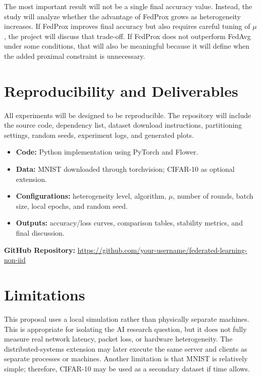 \documentclass[11pt,a4paper]{article}
\begin{document}
The most important result will not be a single final accuracy value. Instead, the study will analyze whether the advantage of FedProx grows as heterogeneity increases. If FedProx improves final accuracy but also requires careful tuning of $\mu$, the project will discuss that trade-off. If FedProx does not outperform FedAvg under some conditions, that will also be meaningful because it will define when the added proximal constraint is unnecessary.

\section{Reproducibility and Deliverables}

All experiments will be designed to be reproducible. The repository will include the source code, dependency list, dataset download instructions, partitioning settings, random seeds, experiment logs, and generated plots.

\begin{itemize}
    \item \textbf{Code:} Python implementation using PyTorch and Flower.
    \item \textbf{Data:} MNIST downloaded through torchvision; CIFAR-10 as optional extension.
    \item \textbf{Configurations:} heterogeneity level, algorithm, $\mu$, number of rounds, batch size, local epochs, and random seed.
    \item \textbf{Outputs:} accuracy/loss curves, comparison tables, stability metrics, and final discussion.
\end{itemize}

\noindent\textbf{GitHub Repository:} \url{https://github.com/your-username/federated-learning-non-iid}

\section{Limitations}

This proposal uses a local simulation rather than physically separate machines. This is appropriate for isolating the AI research question, but it does not fully measure real network latency, packet loss, or hardware heterogeneity. The distributed-systems extension may later execute the same server and clients as separate processes or machines. Another limitation is that MNIST is relatively simple; therefore, CIFAR-10 may be used as a secondary dataset if time allows.
\end{document}
